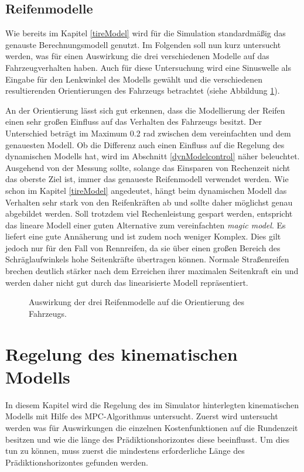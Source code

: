 \documentclass{like}
\begin{document}
\section{Reifenmodelle}
Wie bereits im Kapitel \ref{tireModel} wird für die Simulation standardmäßig das genauste Berechnungsmodell genutzt. Im Folgenden soll nun kurz untersucht werden, was für einen Auswirkung die drei verschiedenen Modelle auf das Fahrzeugverhalten haben. Auch für diese Untersuchung wird eine Sinuswelle als Eingabe für den Lenkwinkel des Modells gewählt und die verschiedenen resultierenden Orientierungen des Fahrzeugs betrachtet (siehe Abbildung \ref{fig:modelDiffTires}).


An der Orientierung lässt sich gut erkennen, dass die Modellierung der Reifen einen sehr großen Einfluss auf das Verhalten des Fahrzeugs besitzt. Der Unterschied beträgt im Maximum 0.2 rad zwischen dem vereinfachten und dem genauesten Modell. 
Ob die Differenz auch einen Einfluss auf die Regelung des dynamischen Modells hat, wird im Abschnitt \ref{dynModelcontrol} näher beleuchtet. \\
Ausgehend von der Messung sollte, solange das Einsparen von Rechenzeit nicht das oberste Ziel ist, immer das genaueste Reifenmodell verwendet werden. Wie schon im Kapitel \ref{tireModel} angedeutet, hängt beim dynamischen Modell das Verhalten sehr stark von den Reifenkräften ab und sollte daher möglichst genau abgebildet werden. Soll trotzdem viel Rechenleistung gespart werden, entspricht das lineare Modell einer guten Alternative zum vereinfachten \emph{magic model}. Es liefert eine gute Annäherung und ist zudem noch weniger Komplex. Dies gilt jedoch nur für den Fall von Rennreifen, da sie über einen großen Bereich des Schräglaufwinkels hohe Seitenkräfte übertragen können. Normale Straßenreifen brechen deutlich stärker nach dem Erreichen ihrer maximalen Seitenkraft ein und werden daher nicht gut durch das linearisierte Modell repräsentiert. 


\begin{figure}
	\centering
	 
	\caption{Auswirkung der drei Reifenmodelle auf die Orientierung des Fahrzeugs.}
	\label{fig:modelDiffTires}
\end{figure}

\chapter{Regelung des kinematischen Modells}
In diesem Kapitel wird die Regelung des im Simulator hinterlegten kinematischen Modells mit Hilfe des \ac{MPC}-Algorithmus untersucht. Zuerst wird untersucht werden was für Auswirkungen die einzelnen Kostenfunktionen auf die Rundenzeit besitzen und wie die länge des Prädiktionshorizontes diese beeinflusst.
Um dies tun zu können, muss zuerst die mindestens erforderliche Länge des Prädiktionshorizontes gefunden werden. 
\end{document}
